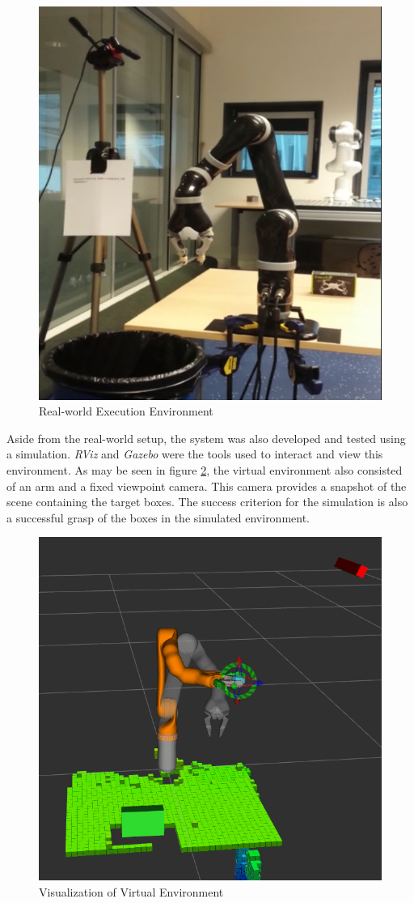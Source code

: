 \documentclass[letterpaper, 10 pt, conference]{conf/ieeeconf}  %
\begin{document}
\begin{figure}[H]
  \centering
  \includegraphics[width=0.6\linewidth]{real_environment.png}
  \caption{\label{fig:real_environment} Real-world Execution Environment}
\end{figure}

Aside from the real-world setup, the system was also developed and tested using
a simulation. \textit{RViz} and \textit{Gazebo} were the tools used to interact
and view this environment. As may be seen in figure
\ref{fig:virtual_environment}, the virtual environment also consisted of an arm
and a fixed viewpoint camera. This camera provides a snapshot of the scene
containing the target boxes. The success criterion for the simulation is also a
successful grasp of the boxes in the simulated environment.

\begin{figure}[H]
  \centering
  \includegraphics[width=0.6\linewidth]{virtual_environment.png}
  \caption{\label{fig:virtual_environment} Visualization of Virtual Environment}
\end{figure}
\end{document}
